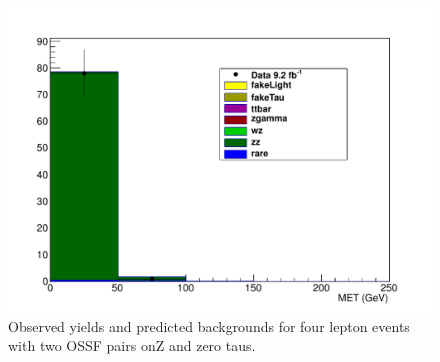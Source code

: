 \begin{figure}[htp]
\begin{center}
\includegraphics[width=1.0\textwidth]{plots/4L_MET_dist_onZ_ossf2_tau0_note.pdf}
\caption{Observed yields and predicted backgrounds for four lepton events with two OSSF pairs onZ and zero taus.}
\label{fig:L4OSSF2onZtau0}
\end{center}
\end{figure}


